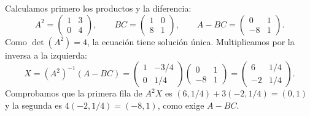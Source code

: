 Calculamos primero los productos y la diferencia:
\[
 A^2=\begin{pmatrix}1&3\\0&4\end{pmatrix},\qquad
 BC=\begin{pmatrix}1&0\\8&1\end{pmatrix},\qquad
 A-BC=\begin{pmatrix}0&1\\-8&1\end{pmatrix}.
\]
Como $\det(A^2)=4$, la ecuación tiene solución única. Multiplicamos por la inversa a la izquierda:
\[
 X=(A^2)^{-1}(A-BC)
 =\begin{pmatrix}1&-3/4\\0&1/4\end{pmatrix}
  \begin{pmatrix}0&1\\-8&1\end{pmatrix}
 =\boxed{\begin{pmatrix}6&1/4\\-2&1/4\end{pmatrix}}.
\]
Comprobamos que la primera fila de $A^2X$ es $(6,1/4)+3(-2,1/4)=(0,1)$ y la segunda es $4(-2,1/4)=(-8,1)$, como exige $A-BC$.
